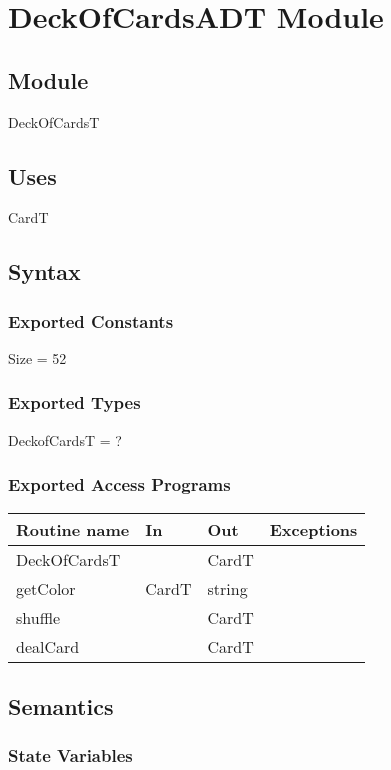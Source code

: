 \documentclass[12pt]{article}
\begin{document}
\newpage
\section* {DeckOfCardsADT Module}

\subsection*{Module}
DeckOfCardsT
\subsection* {Uses}
CardT

\subsection* {Syntax}

\subsubsection* {Exported Constants}
Size = 52 \\
\subsubsection* {Exported Types}
DeckofCardsT = ?
\subsubsection* {Exported Access Programs}

\begin{tabular}{| l | l | l | p{7cm} |}
	\hline
	\textbf{Routine name} & \textbf{In} & \textbf{Out} & \textbf{Exceptions}\\
	\hline
	DeckOfCardsT &  & CardT & \\
	\hline
	getColor& CardT & string & \\
	\hline
	shuffle & ~ & CardT & \\
	\hline
	dealCard & ~ & CardT & \\
	\hline

\end{tabular}

\subsection* {Semantics}

\subsubsection* {State Variables}
\end{document}
